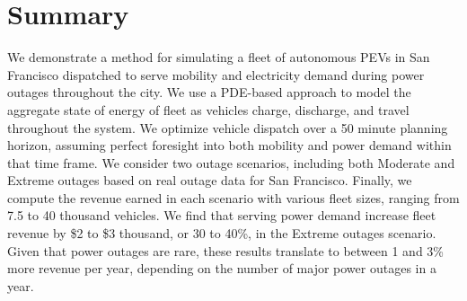 \documentclass[journal]{IEEEtran}
\begin{document}
\section{Summary}
We demonstrate a method for simulating a fleet of autonomous PEVs in San Francisco dispatched to serve mobility and electricity demand during power outages throughout the city. We use a PDE-based approach to model the aggregate state of energy of fleet as vehicles charge, discharge, and travel throughout the system. We optimize vehicle dispatch over a 50 minute planning horizon, assuming perfect foresight into both mobility and power demand within that time frame. We consider two outage scenarios, including both Moderate and Extreme outages based on real outage data for San Francisco. Finally, we compute the revenue earned in each scenario with various fleet sizes, ranging from 7.5 to 40 thousand vehicles. We find that serving power demand increase fleet revenue by \$2 to \$3 thousand, or 30 to 40\%, in the Extreme outages scenario. Given that power outages are rare, these results translate to between 1 and 3\% more revenue per year, depending on the number of major power outages in a year.




\end{document}
